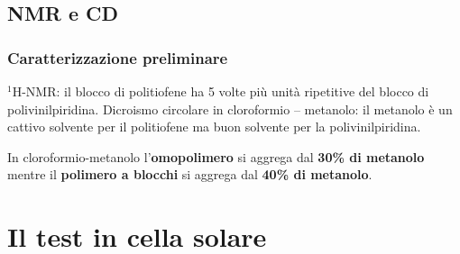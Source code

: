 \documentclass{beamer}
\begin{document}
\subsection{NMR e CD}
\begin{frame}%
\frametitle{Caratterizzazione preliminare}
$^1$H-NMR: il blocco di politiofene ha 5 volte più unità ripetitive del blocco di polivinilpiridina.
\vfill
Dicroismo circolare in cloroformio -- metanolo: il metanolo è un cattivo solvente per il politiofene ma buon solvente per la polivinilpiridina.

In cloroformio-metanolo l'\textbf{omopolimero} si aggrega dal \textbf{30\% di metanolo} mentre il \textbf{polimero a blocchi} si aggrega dal \textbf{40\% di metanolo}. 
\end{frame}
\section{Il test in cella solare}
\end{document}

